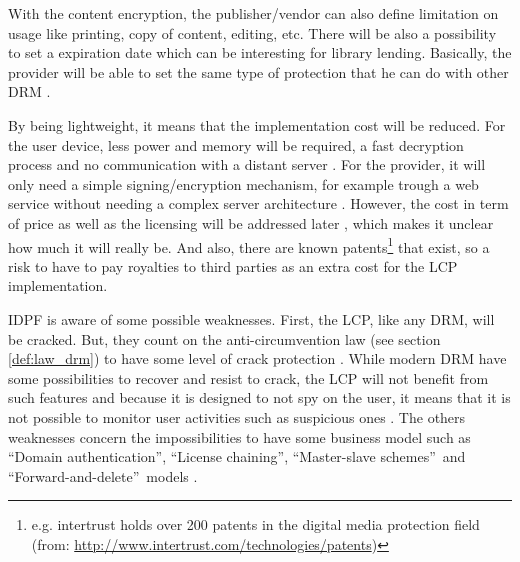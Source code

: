 \documentclass[11pt,a4paper,oneside]{memoir}
\begin{document}
With the content encryption, the publisher/vendor can also define limitation on usage like printing, copy of content, editing, etc. There will be also a possibility to set a expiration date which can be interesting for library lending. Basically, the provider will be able to set the same type of protection that he can do with other DRM \cite[EPUB LCP Requirements section]{idpf:lcp-uc}.

By being lightweight, it means that the implementation cost will be reduced. For the user device, less power and memory will be required, a fast decryption process and no communication with a distant server \cite[What Is LCP? section]{idpf:lcp-uc}. For the provider, it will only need a simple signing/encryption mechanism, for example trough a web service without needing a complex server architecture \cite[What Is LCP? and Requirements sections]{idpf:lcp-rfp}. However, the cost in term of price as well as the licensing will be addressed later \cite[Requirements section]{idpf:lcp-rfp}, which makes it unclear how much it will really be. And also, there are known patents\footnote{e.g. intertrust holds over 200 patents in the digital media protection field (from: \url{http://www.intertrust.com/technologies/patents})} that exist, so a risk to have to pay royalties to third parties as an extra cost for the LCP implementation.

IDPF is aware of some possible weaknesses. First, the LCP, like any DRM, will be cracked. But, they count on the anti-circumvention law (see section \vref{def:law_drm}) to have some level of crack protection \cite[What Is LCP? section]{idpf:lcp-uc}. While modern DRM have some possibilities to recover and resist to crack, the LCP will not benefit from such features and because it is designed to not spy on the user, it means that it is not possible to monitor user activities such as suspicious ones \cite[What Is LCP? section]{idpf:lcp-rfp}. 
The others weaknesses concern the impossibilities to have some business model such as \textquotedblleft Domain authentication\textquotedblright, \textquotedblleft License chaining\textquotedblright, \textquotedblleft Master-slave schemes\textquotedblright ~and \textquotedblleft Forward-and-delete\textquotedblright ~models \cite[What Is LCP? section]{idpf:lcp-rfp}.
\end{document}
